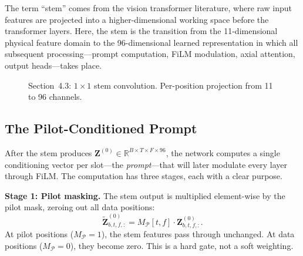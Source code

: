 \documentclass[11pt,a4paper]{article}
\newcommand{\bZ}{\mathbf{Z}}
\begin{document}
	The term ``stem'' comes from the vision transformer literature, where raw input features are projected into a higher-dimensional working space before the transformer layers.  Here, the stem is the transition from the 11-dimensional physical feature domain to the 96-dimensional learned representation in which all subsequent processing---prompt computation, FiLM modulation, axial attention, output heads---takes place.
	
	
	
	\begin{figure}[ht!]
		\centering
		\caption{Section~4.3: $1\!\times\!1$ stem convolution.  Per-position projection from 11 to 96 channels.}
		\label{fig:sec43}
	\end{figure}
	
	\subsection{The Pilot-Conditioned Prompt}
	\label{sec:prompt}
	
	After the stem produces $\bZ^{(0)} \in \mathbb{R}^{B \times T \times F \times 96}$, the network computes a single conditioning vector per slot---the \emph{prompt}---that will later modulate every layer through FiLM.  The computation has three stages, each with a clear purpose.
	
	\medskip\noindent
	\textbf{Stage 1: Pilot masking.}\quad
	The stem output is multiplied element-wise by the pilot mask, zeroing out all data positions:
	\begin{equation}
		\widetilde{\bZ}^{(0)}_{b,t,f,:} = M_\mathcal{P}[t,f] \cdot \bZ^{(0)}_{b,t,f,:}.
		\label{eq:prompt_mask}
	\end{equation}
	At pilot positions ($M_\mathcal{P} = 1$), the stem features pass through unchanged.  At data positions ($M_\mathcal{P} = 0$), they become zero.  This is a hard gate, not a soft weighting.
	
\end{document}
